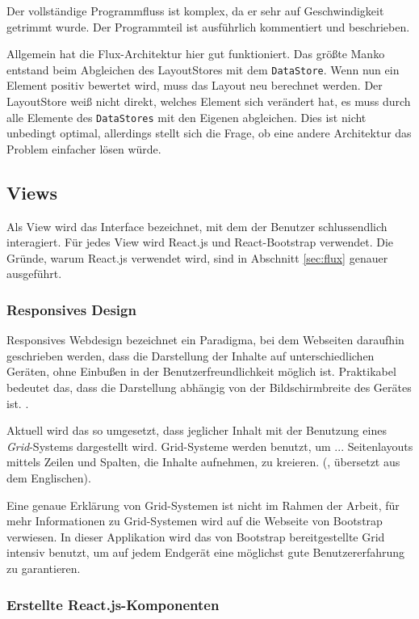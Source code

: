 \documentclass[12pt,twoside]{book}
\begin{document}
Der vollständige Programmfluss ist komplex, da er sehr auf Geschwindigkeit getrimmt wurde. Der Programmteil ist ausführlich kommentiert und beschrieben.

Allgemein hat die Flux-Architektur hier gut funktioniert. Das größte Manko entstand beim Abgleichen des LayoutStores mit dem \texttt{DataStore}. Wenn nun ein Element positiv bewertet wird, muss das Layout neu berechnet werden. Der LayoutStore weiß nicht direkt, welches Element sich verändert hat, es muss durch alle Elemente des \texttt{DataStores} mit den Eigenen abgleichen. Dies ist nicht unbedingt optimal, allerdings stellt sich die Frage, ob eine andere Architektur das Problem einfacher lösen würde.

\subsection{Views}

Als View wird das Interface bezeichnet, mit dem der Benutzer schlussendlich interagiert. Für jedes View wird React.js und React-Bootstrap verwendet. Die Gründe, warum React.js verwendet wird, sind in Abschnitt \ref{sec:flux} genauer ausgeführt.

\subsubsection*{Responsives Design}

Responsives Webdesign bezeichnet ein Paradigma, bei dem Webseiten daraufhin geschrieben werden, dass die Darstellung der Inhalte auf unterschiedlichen Geräten, ohne Einbußen in der Benutzerfreundlichkeit möglich ist. Praktikabel bedeutet das, dass die Darstellung abhängig von der Bildschirmbreite des Gerätes ist. \cite{natda2013responsive}.

Aktuell wird das so umgesetzt, dass jeglicher Inhalt mit der Benutzung eines \textit{Grid}-Systems dargestellt wird. Grid-Systeme werden benutzt, um \glqq ... Seitenlayouts mittels Zeilen und Spalten, die Inhalte aufnehmen, zu kreieren.\grqq{} (\cite{bootstrap}, übersetzt aus dem Englischen).

Eine genaue Erklärung von Grid-Systemen ist nicht im Rahmen der Arbeit, für mehr Informationen zu Grid-Systemen wird auf die Webseite von Bootstrap \cite{bootstrap} verwiesen.
In dieser Applikation wird das von Bootstrap bereitgestellte Grid intensiv benutzt, um auf jedem Endgerät eine möglichst gute Benutzererfahrung zu garantieren.

\subsubsection*{Erstellte React.js-Komponenten}
\end{document}
